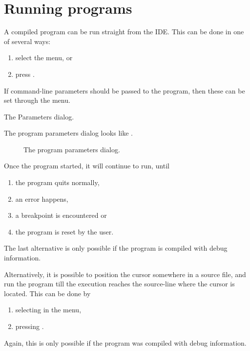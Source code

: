 \section{Running programs}
\label{se:running}
A compiled program can be run straight from the IDE. This can be done
in one of several ways:
\begin{enumerate}
\item select the  menu, or
\item press .
\end{enumerate}
If command-line parameters should be passed to the program, then these
can be set through the  menu. 
\begin{htmlonly}
The Parameters dialog.
\end{htmlonly}
\begin{latexonly}
The program parameters dialog looks like .
\begin{figure}[ht]
\caption{The program parameters dialog.}\label{fig:params}
\ifpdf
{}
\else
{}
\fi
\end{figure}
\end{latexonly}

Once the program started, it will continue to run, until 
\begin{enumerate}
\item the program quits normally,
\item an error happens,
\item a breakpoint is encountered or
\item the program is reset by the user.
\end{enumerate}
The last alternative is only possible if the program is compiled
with debug information.

Alternatively, it is possible to position the cursor somewhere in a
source file, and run the program till the execution reaches the
source-line where the cursor is located. This can be done by
\begin{enumerate}
\item selecting  in the menu,
\item pressing .
\end{enumerate}
Again, this is only possible if the program was compiled with debug
information.


